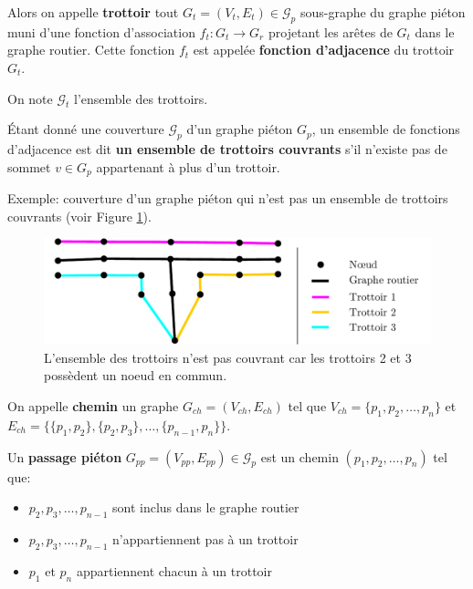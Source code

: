 \begin{definition}
    Alors on appelle \textbf{trottoir} tout $G_t = (V_t, E_t)\in \mathcal{G}_p$ sous-graphe du graphe piéton muni d'une fonction d'association $f_t: G_t \rightarrow G_r$ projetant les arêtes de $G_t$ dans le graphe routier. Cette fonction $f_t$ est appelée \textbf{fonction d'adjacence} du trottoir $G_t$.

    On note $\mathcal{G}_t$ l'ensemble des trottoirs.
\end{definition}

\begin{definition}
    Étant donné une couverture $\mathcal{G}_p$ d'un graphe piéton $G_p$, un ensemble de fonctions d'adjacence est dit \textbf{un ensemble de trottoirs couvrants} s'il n'existe pas de sommet $v \in G_p$ appartenant à plus d'un trottoir.
\end{definition}

\noindent
Exemple: couverture d'un graphe piéton qui n'est pas un ensemble de trottoirs couvrants (voir Figure \ref{fig:mod_ex_trottoirs_couvrants}).

\begin{figure}[ht]
    \centering
    \includegraphics[width=\textwidth]{images/modelisation/graphe/trottoirs_non_couvrants.pdf}
    \caption[Ensemble de trottoirs non-couvrants]{L'ensemble des trottoirs n'est pas couvrant car les trottoirs 2 et 3 possèdent un noeud en commun.}
    \label{fig:mod_ex_trottoirs_couvrants}
\end{figure}

\begin{definition}
    On appelle \textbf{chemin} un graphe $G_{ch} = (V_{ch}, E_{ch})$ tel que $V_{ch}=\{p_1,p_2,\dots,p_n\}$ et $E_{ch}=\{\{p_1,p_2\},\{p_2,p_3\},\dots,\{p_{n-1},p_n\}\}$.
\end{definition}

\begin{definition}
    Un \textbf{passage piéton} $G_{pp} = (V_{pp}, E_{pp}) \in \mathcal{G}_p$ est un chemin $(p_1, p_2,\dots, p_n)$ tel que:

    \begin{itemize}
        \item $p_2, p_3, \dots, p_{n-1}$ sont inclus dans le graphe routier
        \item $p_2, p_3, \dots, p_{n-1}$ n'appartiennent pas à un trottoir
        \item $p_1$ et $p_n$ appartiennent chacun à un trottoir
    \end{itemize}
\end{definition}

